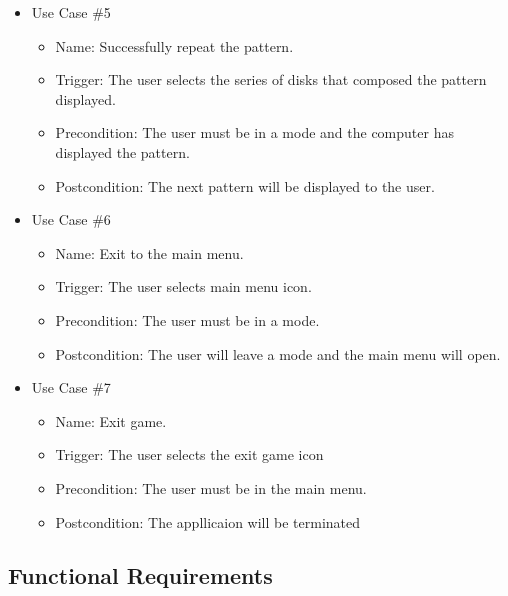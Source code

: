 \documentclass[12pt, titlepage]{article}
\begin{document}
\begin{itemize}
\item Use Case \#5
\begin{itemize}
\item Name: Successfully repeat the pattern.
\item Trigger: The user selects the series of disks that composed the pattern displayed.
\item Precondition: The user must be in a mode and the computer has displayed the pattern.
\item Postcondition: The next pattern will be displayed to the user.
\end{itemize}

\item Use Case \#6
\begin{itemize}
\item Name: Exit to the main menu.
\item Trigger: The user selects main menu icon.
\item Precondition: The user must be in a mode. 
\item Postcondition: The user will leave a mode and the main menu will open.
\end{itemize}

\item Use Case \#7
\begin{itemize}
\item Name: Exit game.
\item Trigger: The user selects the exit game icon
\item Precondition: The user must be in the main menu. 
\item Postcondition: The appllicaion will be terminated
\end{itemize}

\end{itemize}

\subsection{Functional Requirements}
\end{document}

